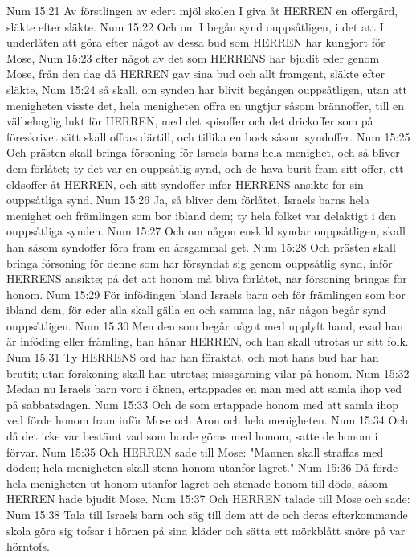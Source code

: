 Num 15:21  Av förstlingen av edert mjöl skolen I giva åt HERREN en offergärd, släkte efter släkte.
Num 15:22  Och om I begån synd ouppsåtligen, i det att I underlåten att göra efter något av dessa bud som HERREN har kungjort för Mose,
Num 15:23  efter något av det som HERRENS har bjudit eder genom Mose, från den dag då HERREN gav sina bud och allt framgent, släkte efter släkte,
Num 15:24  så skall, om synden har blivit begången ouppsåtligen, utan att menigheten visste det, hela menigheten offra en ungtjur såsom brännoffer, till en välbehaglig lukt för HERREN, med det spisoffer och det drickoffer som på föreskrivet sätt skall offras därtill, och tillika en bock såsom syndoffer.
Num 15:25  Och prästen skall bringa försoning för Israels barns hela menighet, och så bliver dem förlåtet; ty det var en ouppsåtlig synd, och de hava burit fram sitt offer, ett eldsoffer åt HERREN, och sitt syndoffer inför HERRENS ansikte för sin ouppsåtliga synd.
Num 15:26  Ja, så bliver dem förlåtet, Israels barns hela menighet och främlingen som bor ibland dem; ty hela folket var delaktigt i den ouppsåtliga synden.
Num 15:27  Och om någon enskild syndar ouppsåtligen, skall han såsom syndoffer föra fram en årsgammal get.
Num 15:28  Och prästen skall bringa försoning för denne som har försyndat sig genom ouppsåtlig synd, inför HERRENS ansikte; på det att honom må bliva förlåtet, när försoning bringas för honom.
Num 15:29  För infödingen bland Israels barn och för främlingen som bor ibland dem, för eder alla skall gälla en och samma lag, när någon begår synd ouppsåtligen.
Num 15:30  Men den som begår något med upplyft hand, evad han är inföding eller främling, han hånar HERREN, och han skall utrotas ur sitt folk.
Num 15:31  Ty HERRENS ord har han föraktat, och mot hans bud har han brutit; utan förskoning skall han utrotas; missgärning vilar på honom.
Num 15:32  Medan nu Israels barn voro i öknen, ertappades en man med att samla ihop ved på sabbatsdagen.
Num 15:33  Och de som ertappade honom med att samla ihop ved förde honom fram inför Mose och Aron och hela menigheten.
Num 15:34  Och då det icke var bestämt vad som borde göras med honom, satte de honom i förvar.
Num 15:35  Och HERREN sade till Mose: "Mannen skall straffas med döden; hela menigheten skall stena honom utanför lägret."
Num 15:36  Då förde hela menigheten ut honom utanför lägret och stenade honom till döds, såsom HERREN hade bjudit Mose.
Num 15:37  Och HERREN talade till Mose och sade:
Num 15:38  Tala till Israels barn och säg till dem att de och deras efterkommande skola göra sig tofsar i hörnen på sina kläder och sätta ett mörkblått snöre på var hörntofs.
